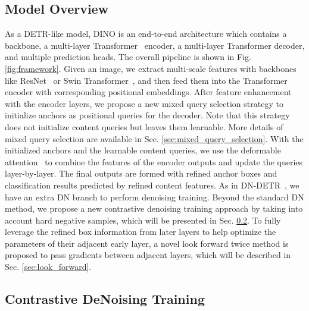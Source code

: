 \documentclass[runningheads]{llncs}
\begin{document}
\subsection{Model Overview}
As a DETR-like model, DINO is an end-to-end architecture which contains a backbone, a multi-layer Transformer~\cite{vaswani2017attention} encoder, a multi-layer Transformer decoder, and multiple prediction heads. The overall pipeline is shown in Fig. \ref{fig:framework}. 
Given an image, we extract multi-scale features with backbones like ResNet~\cite{he2015deep} or Swin Transformer~\cite{liu2021swin}, and then feed them into the Transformer encoder with corresponding positional embeddings. After feature enhancement with the encoder layers, we propose a new mixed query selection strategy to initialize anchors as positional queries for the decoder. Note that this strategy does not initialize content queries but leaves them learnable. More details of mixed query selection are available in Sec. \ref{sec:mixed_query_selection}. 
With the initialized anchors and the learnable content queries, we use the deformable attention~\cite{zhu2020deformable} to combine the features of the encoder outputs and update the queries layer-by-layer. The final outputs are formed with refined anchor boxes and classification results predicted by refined content features. 
As in DN-DETR~\cite{li2022dn}, we have an extra DN branch to perform denoising training. Beyond the standard DN method, we propose a new contrastive denoising training approach by taking into account hard negative samples, which will be presented in Sec. \ref{sec:contrastive_dn}. 
To fully leverage the refined box information from later layers to help optimize the parameters of their adjacent early layer, a novel look forward twice method is proposed to pass gradients between adjacent layers, which will be described in Sec. \ref{sec:look_forward}.





\subsection{Contrastive DeNoising Training}
\label{sec:contrastive_dn}
\end{document}
